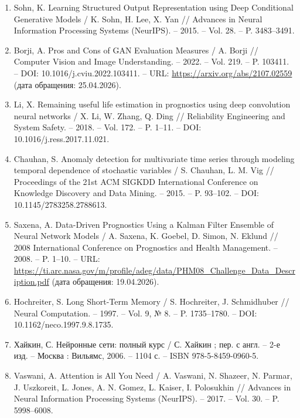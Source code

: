 \documentclass[14pt, a4paper, oneside]{extreport}
\begin{document}
\begin{enumerate}
\item Sohn, K. Learning Structured Output Representation using Deep Conditional Generative Models / K. Sohn, H. Lee, X. Yan // Advances in Neural Information Processing Systems (NeurIPS). – 2015. – Vol. 28. – P. 3483–3491.

\item Borji, A. Pros and Cons of GAN Evaluation Measures / A. Borji // Computer Vision and Image Understanding. – 2022. – Vol. 219. – P. 103411. – DOI: 10.1016/j.cviu.2022.103411. – URL: \url{https://arxiv.org/abs/2107.02559} (дата обращения: 25.04.2026).

\item Li, X. Remaining useful life estimation in prognostics using deep convolution neural networks / X. Li, W. Zhang, Q. Ding // Reliability Engineering and System Safety. – 2018. – Vol. 172. – P. 1–11. – DOI: 10.1016/j.ress.2017.11.021.

\item Chauhan, S. Anomaly detection for multivariate time series through modeling temporal dependence of stochastic variables / S. Chauhan, L. M. Vig // Proceedings of the 21st ACM SIGKDD International Conference on Knowledge Discovery and Data Mining. – 2015. – P. 93–102. – DOI: 10.1145/2783258.2788613.

\item Saxena, A. Data-Driven Prognostics Using a Kalman Filter Ensemble of Neural Network Models / A. Saxena, K. Goebel, D. Simon, N. Eklund // 2008 International Conference on Prognostics and Health Management. – 2008. – P. 1–10. – URL: \url{https://ti.arc.nasa.gov/m/profile/adeg/data/PHM08_Challenge_Data_Description.pdf} (дата обращения: 19.04.2026).

\item Hochreiter, S. Long Short-Term Memory / S. Hochreiter, J. Schmidhuber // Neural Computation. – 1997. – Vol. 9, № 8. – P. 1735–1780. – DOI: 10.1162/neco.1997.9.8.1735.

\item Хайкин, С. Нейронные сети: полный курс / С. Хайкин ; пер. с англ. – 2-е изд. – Москва : Вильямс, 2006. – 1104 с. – ISBN 978-5-8459-0960-5.


\item Vaswani, A. Attention is All You Need / A. Vaswani, N. Shazeer, N. Parmar, J. Uszkoreit, L. Jones, A. N. Gomez, L. Kaiser, I. Polosukhin // Advances in Neural Information Processing Systems (NeurIPS). – 2017. – Vol. 30. – P. 5998–6008.


\end{enumerate}
\end{document}
